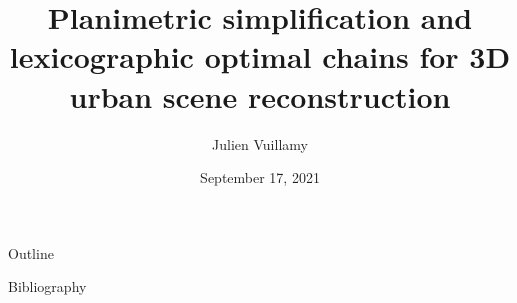 \documentclass[
]{beamer}
\title{Planimetric simplification and lexicographic optimal chains for 3D urban scene reconstruction}
\author[Julien Vuillamy]{Julien Vuillamy}
\institute[]{Dassault Systèmes Provence - INRIA Sophia Antipolis TITANE}
\date{September 17, 2021}
\newcommand\blfootnote[1]{%
	\begingroup
	\renewcommand\thefootnote{}\footnote{#1}%
	\addtocounter{footnote}{-1}%
	\endgroup
}
\begin{document}
	\begin{frame}
		\titlepage
	\end{frame}

	\begin{frame}{Outline}
		\tableofcontents[hideallsubsections]
	\end{frame}
	
	
	
	
	
		
	\appendix
	
	

\begin{frame}[allowframebreaks]{Bibliography}


\end{frame}

\end{document}
